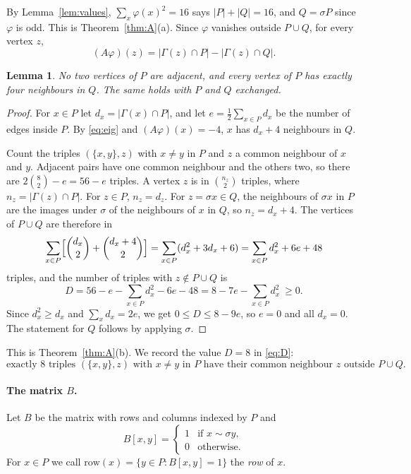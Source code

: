 \documentclass[11pt,a4paper]{article}
\newtheorem{lemma}[theorem]{Lemma}
\theoremstyle{remark}
\newcommand{\sg}{\sigma}
\newcommand{\Nb}{\Gamma}
\begin{document}
By Lemma~\ref{lem:values}, $\sum_x\varphi(x)^2=16$ says $|P|+|Q|=16$, and $Q=\sg P$ since $\varphi$ is odd. This is
Theorem~\ref{thm:A}(a). Since $\varphi$ vanishes outside $P\cup Q$, for every vertex $z$,
\begin{equation}\label{eq:eig}
(A\varphi)(z)=|\Nb(z)\cap P|-|\Nb(z)\cap Q| .
\end{equation}

\begin{lemma}\label{lem:indep}
No two vertices of $P$ are adjacent, and every vertex of $P$ has exactly four neighbours in $Q$. The same holds with
$P$ and $Q$ exchanged.
\end{lemma}
\begin{proof}
For $x\in P$ let $d_x=|\Nb(x)\cap P|$, and let $e=\frac12\sum_{x\in P}d_x$ be the number of edges inside $P$. By
\eqref{eq:eig} and $(A\varphi)(x)=-4$, $x$ has $d_x+4$ neighbours in $Q$.

Count the triples $(\{x,y\},z)$ with $x\ne y$ in $P$ and $z$ a common neighbour of $x$ and $y$. Adjacent pairs have
one common neighbour and the others two, so there are $2\binom82-e=56-e$ triples. A vertex $z$ is in
$\binom{n_z}2$ triples, where $n_z=|\Nb(z)\cap P|$. For $z\in P$, $n_z=d_z$. For $z=\sg x\in Q$, the neighbours of
$\sg x$ in $P$ are the images under $\sg$ of the neighbours of $x$ in $Q$, so $n_z=d_x+4$. The vertices of $P\cup Q$
are therefore in
\[
\sum_{x\in P}\Bigl[\binom{d_x}2+\binom{d_x+4}2\Bigr]=\sum_{x\in P}(d_x^2+3d_x+6)=\sum_{x\in P}d_x^2+6e+48
\]
triples, and the number of triples with $z\notin P\cup Q$ is
\begin{equation}\label{eq:D}
D=56-e-\sum_{x\in P}d_x^2-6e-48=8-7e-\sum_{x\in P}d_x^2\ \ge0 .
\end{equation}
Since $d_x^2\ge d_x$ and $\sum_xd_x=2e$, we get $0\le D\le8-9e$, so $e=0$ and all $d_x=0$. The statement for $Q$
follows by applying $\sg$.
\end{proof}

This is Theorem~\ref{thm:A}(b). We record the value $D=8$ in \eqref{eq:D}:
\begin{equation}\label{eq:D8}
\text{exactly $8$ triples $(\{x,y\},z)$ with $x\ne y$ in $P$ have their common neighbour $z$ outside $P\cup Q$.}
\end{equation}

\paragraph{The matrix $B$.} Let $B$ be the matrix with rows and columns indexed by $P$ and
\[
B[x,y]=\begin{cases}1&\text{if }x\sim\sg y,\\0&\text{otherwise.}\end{cases}
\]
For $x\in P$ we call $\mathrm{row}(x)=\{y\in P:B[x,y]=1\}$ the \emph{row} of $x$.
\end{document}
